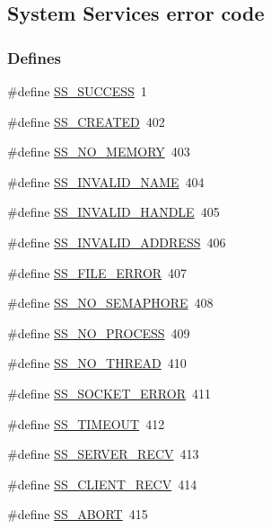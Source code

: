 \subsection{System Services error code}
\label{group__err24}
\subsubsection*{Defines}
\begin{DoxyCompactItemize}
\item 
\#define \hyperlink{group__err24_ga0abac6c68d7a79ce83d1a25b2c800321}{SS\_\-SUCCESS}~1
\item 
\#define \hyperlink{group__err24_ga7440cf35b00082fb16e8584ada5b50e0}{SS\_\-CREATED}~402
\item 
\#define \hyperlink{group__err24_ga39da075b89b283b1ba6ee8163cd75e6d}{SS\_\-NO\_\-MEMORY}~403
\item 
\#define \hyperlink{group__err24_ga77e57c8c5c8a676e50f7b757294044f5}{SS\_\-INVALID\_\-NAME}~404
\item 
\#define \hyperlink{group__err24_ga43a0d1263dfc7b732dbb04271d8599c9}{SS\_\-INVALID\_\-HANDLE}~405
\item 
\#define \hyperlink{group__err24_ga8741bfc9d74c60db4d6978b337cfef93}{SS\_\-INVALID\_\-ADDRESS}~406
\item 
\#define \hyperlink{group__err24_ga25ab2ae4b1702824549b8e40a6e86718}{SS\_\-FILE\_\-ERROR}~407
\item 
\#define \hyperlink{group__err24_ga693cdd4ddba4919824025c1c7339e54d}{SS\_\-NO\_\-SEMAPHORE}~408
\item 
\#define \hyperlink{group__err24_ga45a5e45d0c1bb8ac8b23385a95ffd20d}{SS\_\-NO\_\-PROCESS}~409
\item 
\#define \hyperlink{group__err24_ga164e3fc92adb05840a3442728c181793}{SS\_\-NO\_\-THREAD}~410
\item 
\#define \hyperlink{group__err24_gabfc9c001ee2e4f077a312cf4cf820dfe}{SS\_\-SOCKET\_\-ERROR}~411
\item 
\#define \hyperlink{group__err24_ga4ceb5b10e3abde2c178d87192664044f}{SS\_\-TIMEOUT}~412
\item 
\#define \hyperlink{group__err24_ga3f947813c830bdf148673ad0c29e00f7}{SS\_\-SERVER\_\-RECV}~413
\item 
\#define \hyperlink{group__err24_gafe9fb1a199a6e53c4478a0fe83931986}{SS\_\-CLIENT\_\-RECV}~414
\item 
\#define \hyperlink{group__err24_ga136923b4499af07f13a3cd631b88ec0e}{SS\_\-ABORT}~415

\end{DoxyCompactItemize}
